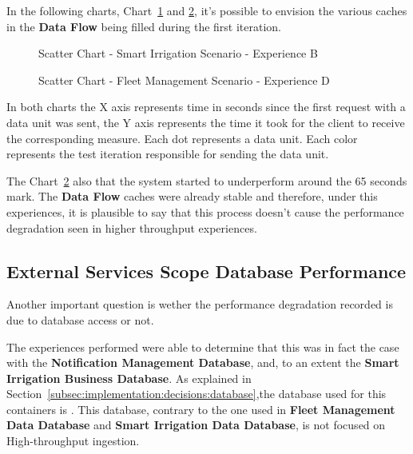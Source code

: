 In the following charts, Chart~\ref{fig:evaluation:overview:cache:chart:s2eB} and \ref{fig:evaluation:overview:cache:chart:s1eD}, it's possible to envision the various caches in the \textbf{Data Flow} being filled during the first iteration.

\begin{figure}[H]
    \centering
    
    \caption[Scatter Chart - Smart Irrigation Scenario - Experience B]{Scatter Chart - Smart Irrigation Scenario - Experience B}
    \label{fig:evaluation:overview:cache:chart:s2eB}
 \end{figure}

\begin{figure}[H]
    \centering
    
    \caption[Scatter Chart - Fleet Management Scenario - Experience D]{Scatter Chart - Fleet Management Scenario - Experience D}
    \label{fig:evaluation:overview:cache:chart:s1eD}
\end{figure}

In both charts the X axis represents time in seconds since the first request with a data unit was sent, the Y axis represents the time it took for the client to receive the corresponding measure. Each dot represents a data unit.
Each color represents the test iteration responsible for sending the data unit.

The Chart~\ref{fig:evaluation:overview:cache:chart:s1eD} also that the system started to underperform around the 65 seconds mark. The \textbf{Data Flow} caches were already stable and therefore, under this experiences, it is plausible to say that this process doesn't cause the performance degradation seen in higher throughput experiences.

\subsection{External Services Scope Database Performance}
\label{subsec:evaluation:overview:servicedatabase}

Another important question is wether the performance degradation recorded is due to database access or not.

The experiences performed were able to determine that this was in fact the case with the \textbf{Notification Management Database}, and, to an extent the \textbf{Smart Irrigation Business Database}. As explained in Section~\ref{subsec:implementation:decisions:database},the database used for this containers is .
This database, contrary to the one used in \textbf{Fleet Management Data Database} and \textbf{Smart Irrigation Data Database}, is not focused on High-throughput ingestion.

